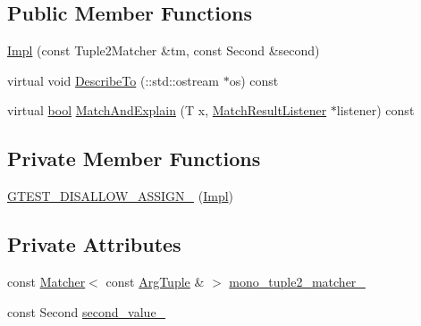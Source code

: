 \subsection*{Public Member Functions}
\begin{DoxyCompactItemize}
\item 
\hyperlink{classtesting_1_1internal_1_1BoundSecondMatcher_1_1Impl_a352ff39ee60ec7eead0ddd82b8feaf1f}{Impl} (const Tuple2\+Matcher \&tm, const Second \&second)
\item 
virtual void \hyperlink{classtesting_1_1internal_1_1BoundSecondMatcher_1_1Impl_ada7c4fd01c568c48f929dc34b3281aff}{Describe\+To} (\+::std\+::ostream $\ast$os) const
\item 
virtual \hyperlink{classbool}{bool} \hyperlink{classtesting_1_1internal_1_1BoundSecondMatcher_1_1Impl_ae56a4b11434e351d640aceaf82c78be1}{Match\+And\+Explain} (T x, \hyperlink{classtesting_1_1MatchResultListener}{Match\+Result\+Listener} $\ast$listener) const
\end{DoxyCompactItemize}
\subsection*{Private Member Functions}
\begin{DoxyCompactItemize}
\item 
\hyperlink{classtesting_1_1internal_1_1BoundSecondMatcher_1_1Impl_ab1dc41e523e3dd24715ef759f2415626}{G\+T\+E\+S\+T\+\_\+\+D\+I\+S\+A\+L\+L\+O\+W\+\_\+\+A\+S\+S\+I\+G\+N\+\_\+} (\hyperlink{classtesting_1_1internal_1_1BoundSecondMatcher_1_1Impl}{Impl})
\end{DoxyCompactItemize}
\subsection*{Private Attributes}
\begin{DoxyCompactItemize}
\item 
const \hyperlink{classtesting_1_1Matcher}{Matcher}$<$ const \hyperlink{classtesting_1_1internal_1_1BoundSecondMatcher_1_1Impl_acf41615a5de6421fc89fd38118fc6384}{Arg\+Tuple} \& $>$ \hyperlink{classtesting_1_1internal_1_1BoundSecondMatcher_1_1Impl_a7b9610e5665d65f2837eb7e3121c7775}{mono\+\_\+tuple2\+\_\+matcher\+\_\+}
\item 
const Second \hyperlink{classtesting_1_1internal_1_1BoundSecondMatcher_1_1Impl_a240ffac4b65c0fd361d8ff85dca35564}{second\+\_\+value\+\_\+}
\end{DoxyCompactItemize}


